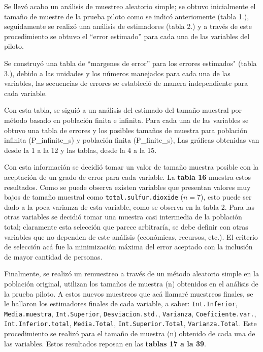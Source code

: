 \documentclass[
]{article}
\begin{document}
Se llevó acabo un análisis de muestreo aleatorio simple; se obtuvo
inicialmente el tamaño de muestre de la prueba piloto como se indicó
anteriomente (tabla 1.), seguidamente se realizó una análisis de
estimadores (tabla 2.) y a través de este procedimiento se obtuvo el
``error estimado'' para cada una de las variables del piloto.

Se construyó una tabla de ``margenes de error'' para los errores
estimados" (tabla 3.), debido a las unidades y los números manejados
para cada una de las variables, las secuencias de errores se estableció
de manera independiente para cada variable.

Con esta tabla, se siguió a un análisis del estimado del tamaño muestral
por método basado en población finita e infinita. Para cada una de las
variables se obtuvo una tabla de errores y los posibles tamaños de
muestra para población infinita (P\_infinite\_s) y población finita
(P\_finite\_s), Las gráficas obtenidas van desde la 1 a la 12 y las
tablas, desde la 4 a la 15.

Con esta información se decidió tomar un valor de tamaño muestra posible
con la aceptación de un grado de error para cada variable. La
\textbf{tabla 16} muestra estos resultados. Como se puede observa
existen variables que presentan valores muy bajos de tamaño muestral
como \texttt{total.sulfur.dioxide} (\(n = 7\)), esto puede ser dado a la
poca varianza de esta variable, como se observa en la tabla 2. Para las
otras variables se decidió tomar una muestra casi intermedia de la
población total; claramente esta selección que parece arbitraría, se
debe definir con otras variables que no dependen de este análisis
(económicas, recursos, etc.). El criterio de selección acá fue la
minimización máxima del error aceptado con la inclusión de mayor
cantidad de personas.

Finalmente, se realizó un remuestreo a través de un método aleatorio
simple en la población original, utilizan los tamaños de muestra (n)
obtenidos en el análisis de la prueba piloto. A estos nuevos muestreos
que acá llamaré muestreos finales, se le hallaron los estimadores
finales de cada variable, a saber: \texttt{Int.Inferior},
\texttt{Media.muestra}, \texttt{Int.Superior}, \texttt{Desviacion.std.},
\texttt{Varianza}, \texttt{Coeficiente.var.},
\texttt{Int.Inferior.total}, \texttt{Media.Total},
\texttt{Int.Superior.Total}, \texttt{Varianza.Total}. Este procedimiento
se realizó para el tamaño de muestra (n) obtenido de cada una de las
variables. Estos resultados reposan en las \textbf{tablas 17 a la 39}.
\end{document}
